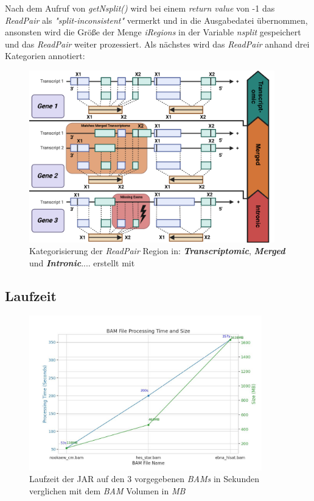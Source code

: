 \documentclass[12pt]{article}
\begin{document}
Nach dem Aufruf von \textit{getNsplit()} wird bei einem \textit{return value} von -1 das \textit{ReadPair} als 
\textit{"split-inconsistent"} vermerkt und in die Ausgabedatei übernommen, ansonsten wird die Grö\ss e der
Menge \textit{iRegions} in der Variable \textit{nsplit} gespeichert und das \textit{ReadPair} weiter prozessiert.
\newpage
Als nächstes wird das \textit{ReadPair} anhand drei Kategorien annotiert:
\begin{figure}[htpb]
    \centering
    \includegraphics[width=0.95\textwidth]{./figures/ReadAnnotation.png}
    \caption{Kategorisierung der \textit{ReadPair} Region in: \textit{\textbf{Transcriptomic}}, \textit{\textbf{Merged}} und \textbf{\textit{Intronic}}.... 
    erstellt mit \cite{biorender}}
    \label{fig:-figures-ReadAnnotation-png}
\end{figure}



\subsection{Laufzeit}
\begin{figure}[htpb]
    \centering
    \includegraphics[width=0.9\textwidth]{./plots/times_bam.jpg}
    \caption{Laufzeit der JAR auf den 3 vorgegebenen \textit{BAMs} in Sekunden verglichen mit dem \textit{BAM} Volumen in \textit{MB} }
    \label{fig:-plots-times_bam-jpg}
\end{figure}
\end{document}
